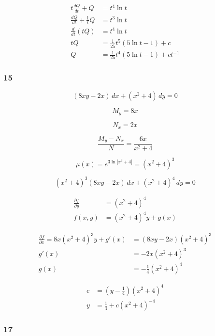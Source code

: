 \documentclass{article}
\begin{document}
\begin{align*}
  t \frac{dQ}{dt} + Q           & = t^4 \ln t                                 \\
  \frac{dQ}{dt} + \frac{1}{t} Q & = t^3 \ln t                                 \\
  \frac{d}{dt} (t Q)            & = t^4 \ln t                                 \\
  t Q                           & = \frac{1}{25} t^5 (5 \ln t - 1) + c        \\
  Q                             & = \frac{1}{25} t^4 (5 \ln t - 1) + c t^{-1}
\end{align*}

\subsubsection{15}

\[(8xy - 2x) \,dx + (x^2 + 4) \,dy = 0\]

\[M_y = 8x\]

\[N_x = 2x\]

\[\frac{M_y - N_x}{N} = \frac{6x}{x^2 + 4}\]

\[\mu(x) = e^{3 \ln |x^2 + 4|} = (x^2 + 4)^3\]

\[(x^2 + 4)^3 (8xy - 2x) \,dx + (x^2 + 4)^4 \,dy = 0\]

\begin{align*}
  \frac{\partial f}{\partial y} & = (x^2 + 4)^4          \\
  f(x, y)                       & = (x^2 + 4)^4 y + g(x)
\end{align*}

\begin{align*}
  \frac{\partial f}{\partial x} = 8x (x^2 + 4)^3 y + g'(x) & = (8xy - 2x) (x^2 + 4)^3   \\
  g'(x)                                                    & = -2x (x^2 + 4)^3          \\
  g(x)                                                     & = -\frac{1}{4} (x^2 + 4)^4
\end{align*}

\begin{align*}
  c & = (y - \frac{1}{4}) (x^2 + 4)^4  \\
  y & = \frac{1}{4} + c (x^2 + 4)^{-4}
\end{align*}

\subsubsection{17}
\end{document}
